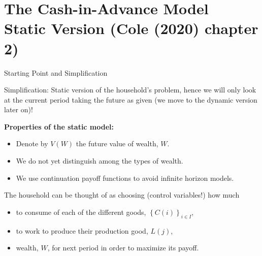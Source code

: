 \documentclass[10pt,c,aspectratio=1610,handout]{beamer}
\begin{document}
\section{The Cash-in-Advance Model\\\small{Static Version (Cole (2020) chapter 2)}}
\begin{frame}{Starting Point and Simplification}%
  \begin{block}{Simplification:}%
    Static version of the household's problem, hence we will only look at the current period taking the future as given (we move to the dynamic version later on)!%
  \end{block}%
  \vspace*{0.1in}%
  \pause%
  \textbf{Properties of the static model:}%
  \begin{itemize}%
    \item[$\blacktriangleright$] Denote by $V(W)$ the future value of wealth, $W$.%
    \item[$\blacktriangleright$] We do not yet distinguish among the types of wealth.%
    \item[$\blacktriangleright$] We use continuation payoff functions to avoid infinite horizon models.%
  \end{itemize}%
  \vspace*{0.1in}%
  \pause%
  The household can be thought of as choosing {\footnotesize(control variables!)} how much%
  \begin{itemize}%
    \item[$\blacktriangleright$] to consume of each of the different goods, $\left\{ C(i)\right\} _{i\in I}$,%
    \item[$\blacktriangleright$] to work to produce their production good, $L(j)$,%
    \item[$\blacktriangleright$] wealth, $W$, for next period in order to maximize its payoff.%
  \end{itemize}%
\end{frame}%
\end{document}
